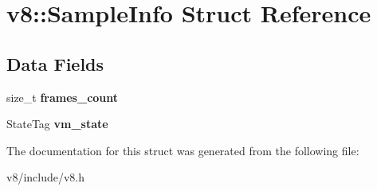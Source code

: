 \hypertarget{structv8_1_1SampleInfo}{}\section{v8\+:\+:Sample\+Info Struct Reference}
\label{structv8_1_1SampleInfo}
\subsection*{Data Fields}
\begin{DoxyCompactItemize}
\item 
\hypertarget{structv8_1_1SampleInfo_a5f1e51bc358605e0c1d38fb2f3d344cd}{}size\+\_\+t {\bfseries frames\+\_\+count}\label{structv8_1_1SampleInfo_a5f1e51bc358605e0c1d38fb2f3d344cd}

\item 
\hypertarget{structv8_1_1SampleInfo_afd6198c9feb44a8df79576cf427b9a91}{}State\+Tag {\bfseries vm\+\_\+state}\label{structv8_1_1SampleInfo_afd6198c9feb44a8df79576cf427b9a91}

\end{DoxyCompactItemize}


The documentation for this struct was generated from the following file\+:\begin{DoxyCompactItemize}
\item 
v8/include/v8.\+h\end{DoxyCompactItemize}
